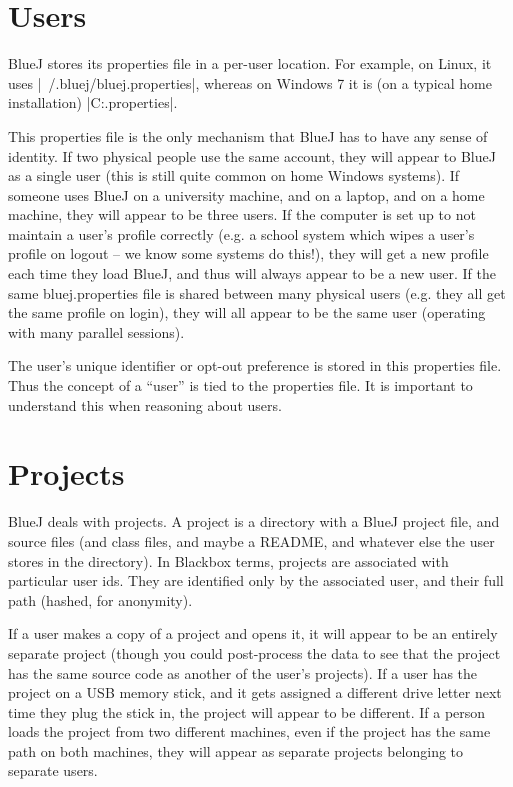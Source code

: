 \documentclass{report}
\begin{document}
\section{Users}
\label{def:users}

BlueJ stores its properties file in a per-user location.  For example, on
Linux, it uses |~/.bluej/bluej.properties|, whereas on Windows 7 it is (on a typical
home installation) |C:\Users\Joe\bluej\bluej.properties|.

This properties file is the only mechanism that BlueJ has to have any sense of
identity.  If two physical people use the same account, they will appear to
BlueJ as a single user (this is still quite common on home Windows systems).
If someone uses BlueJ on a university machine, and on a laptop, and on a home
machine, they will appear to be three users.
If the computer is set up to not maintain a user's profile correctly (e.g. a
school system which wipes a user's profile on logout -- we know some systems
do this!), they will get a new profile each time they load BlueJ, and thus
will always appear to be a new user.  If the same bluej.properties file is
shared between many physical users (e.g. they all get the same profile on
login), they will all appear to be the same user (operating with many parallel sessions).

The user's unique identifier or opt-out preference is stored in this
properties file.  Thus the concept of a ``user'' is tied to the properties
file.  It is important to understand this when reasoning about users.

\section{Projects}
\label{def:projects}

BlueJ deals with projects.  A project is a directory with a BlueJ project
file, and source files (and class files, and maybe a README, and whatever else
the user stores in the directory).  In Blackbox terms, projects are associated
with particular user ids.  They are identified only by the associated user,
and their full path (hashed, for anonymity).

If a user makes a copy of a project and opens it, it will appear to be an
entirely separate project (though you could post-process the data to see that
the project has the same source code as another of the user's projects).  If a
user has the project on a USB memory stick, and it gets assigned a different
drive letter next time they plug the stick in, the project will appear to be
different.  If a person loads the project from two different machines, even if
the project has the same path on both machines, they will appear as separate
projects belonging to separate users.
\end{document}
